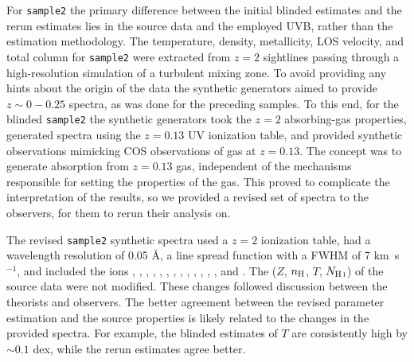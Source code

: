 \documentclass[fleqn,usenatbib]{mnras}
\newcommand{\NHI}{N_{\ion{H}{I}}}
\def\kms{\hbox{km~s$^{-1}$}}
\begin{document}
For \texttt{sample2} the primary difference between the initial blinded estimates and the rerun estimates lies in the source data and the employed UVB,
rather than the estimation methodology.
The temperature, density, metallicity, LOS velocity, and total column for \texttt{sample2} were extracted from $z=2$ sightlines passing through a high-resolution simulation of a turbulent mixing zone.
To avoid providing any hints about the origin of the data the synthetic generators aimed to provide $z \sim 0 - 0.25$ spectra,
as was done for the preceding samples.
To this end, for the blinded \texttt{sample2} the synthetic generators took the $z=2$ absorbing-gas properties,
generated spectra using the $z=0.13$ UV ionization table,
and provided synthetic observations mimicking COS observations of gas at $z=0.13$.
The concept was to generate absorption from $z=0.13$ gas,
independent of the mechanisms responsible for setting the properties of the gas.
This proved to complicate the interpretation of the results, so we provided a revised set of spectra to the observers, for them to rerun their analysis on.

The revised \texttt{sample2} synthetic spectra used a $z=2$ ionization table,
had a wavelength resolution of 0.05 \AA,
a line spread function with a FWHM of 7 {\kms},
and included the ions , , , , , , , , , , , , , and .
The ($Z$, $n_{\rm H}$, $T$, $\NHI$) of the source data were not modified.
These changes followed discussion between the theorists and observers.
The better agreement between the revised parameter estimation and the source properties is likely related to the changes in the provided spectra.
For example, the blinded estimates of $T$ are consistently high by $\sim 0.1$ dex,
while the rerun estimates agree better.
\end{document}
